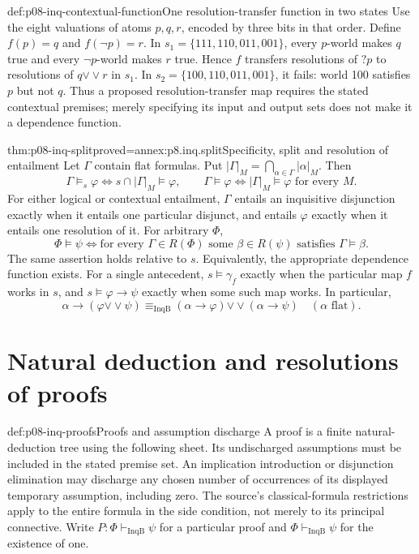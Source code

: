 \begin{hbexample}{def:p08-inq-contextual-function}{One resolution-transfer function in two states}
Use the eight valuations of atoms \(p,q,r\), encoded by three bits in that
order. Define \(f(p)=q\) and \(f(\neg p)=r\). In
\(s_1=\{111,110,011,001\}\), every \(p\)-world makes \(q\) true and
every \(\neg p\)-world makes \(r\) true. Hence \(f\) transfers resolutions
of \(?p\) to resolutions of \(q\mathbin{\vee\!\vee}r\) in \(s_1\).
In \(s_2=\{100,110,011,001\}\), it fails: world 100 satisfies \(p\)
but not \(q\). Thus a proposed resolution-transfer map
requires the stated contextual premises; merely specifying its input
and output sets does not make it a dependence function.
\end{hbexample}

\begin{hbtheorem}{thm:p08-inq-split}{proved=annex:p8.inq.split}{Specificity, split and resolution of entailment}
Let \(\Gamma\) contain flat formulas. Put
\(|\Gamma|_M=\bigcap_{\alpha\in\Gamma}|\alpha|_M\). Then
\[
 \Gamma\models_s\varphi
 \Longleftrightarrow s\cap|\Gamma|_M\models\varphi,
 \qquad
 \Gamma\models\varphi
 \Longleftrightarrow |\Gamma|_M\models\varphi\text{ for every }M.
\]
For either logical or contextual entailment, \(\Gamma\) entails an
inquisitive disjunction exactly when it entails one particular disjunct,
and entails \(\varphi\) exactly when it entails one resolution of it.
For arbitrary \(\Phi\),
\[
 \Phi\models\psi
 \Longleftrightarrow
 \text{for every }\Gamma\in R(\Phi)\text{ some }\beta\in R(\psi)
 \text{ satisfies }\Gamma\models\beta.
\]
The same assertion holds relative to \(s\). Equivalently, the appropriate
dependence function exists. For a single antecedent,
\(s\models\gamma_f\) exactly when the particular map \(f\) works
in \(s\), and \(s\models\varphi\to\psi\) exactly when some
such map works. In particular,
\[
 \alpha\to(\varphi\mathbin{\vee\!\vee}\psi)
 \equiv_{\mathrm{InqB}}
 (\alpha\to\varphi)\mathbin{\vee\!\vee}(\alpha\to\psi)
 \quad(\alpha\text{ flat}).
\]
\end{hbtheorem}

\section{Natural deduction and resolutions of proofs}

\begin{hbdefinition}{def:p08-inq-proofs}{Proofs and assumption discharge}
A proof is a finite natural-deduction tree using the following sheet.
Its undischarged assumptions must be included in the stated premise set.
An implication introduction or disjunction elimination may discharge any
chosen number of occurrences of its displayed temporary assumption,
including zero. The source's classical-formula restrictions apply to the
entire formula in the side condition, not merely to its principal connective.
Write \(P:\Phi\vdash_{\mathrm{InqB}}\psi\) for a particular proof and
\(\Phi\vdash_{\mathrm{InqB}}\psi\) for the existence of one.
\end{hbdefinition}

